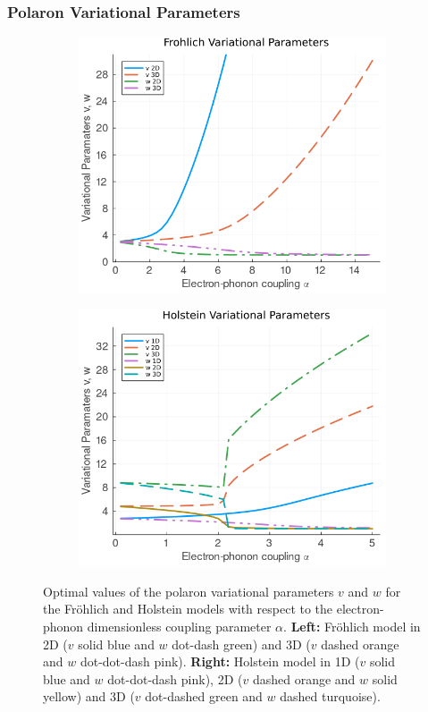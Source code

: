 \subsubsection{Polaron Variational Parameters}

\begin{figure}
  \begin{subfigure}[b]{0.49\textwidth}
    \includegraphics[width=\textwidth]{figures/vw_alpha_fro.png}
  \end{subfigure}
  \hfill
  \begin{subfigure}[b]{0.49\textwidth}
    \includegraphics[width=\textwidth]{figures/vw_alpha_hol.png}
  \end{subfigure}
  \caption{Optimal values of the polaron variational parameters $v$ and $w$ for the Fr\"ohlich and Holstein models with respect to the electron-phonon dimensionless coupling parameter $\alpha$. \textbf{Left:} Fr\"ohlich model in 2D ($v$ solid blue and $w$ dot-dash green) and 3D ($v$ dashed orange and $w$ dot-dot-dash pink). \textbf{Right:} Holstein model in 1D ($v$ solid blue and $w$ dot-dot-dash pink), 2D ($v$ dashed orange and $w$ solid yellow) and 3D ($v$ dot-dashed green and $w$ dashed turquoise).}
  \label{fig:vw_alpha}
\end{figure}
